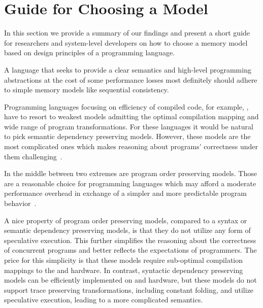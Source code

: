 \section{Guide for Choosing a Model}
\label{sec:discussion}

In this section we provide a summary of our findings
and present a short guide for researchers and system-level developers 
on how to choose a memory model based on 
design principles of a programming language.   

A language that seeks to provide a clear semantics and 
high-level programming abstractions at the cost 
of some performance losses most definitely should 
adhere to simple memory models like sequential consistency. 

Programming languages focusing on efficiency 
of compiled code, for example, \CPP, 
have to resort to weakest models admitting 
the optimal compilation mapping 
and wide range of program transformations. 
For these languages it would be natural 
to pick semantic dependency preserving models.
However, these models are the most complicated ones
which makes reasoning about programs' correctness
under them challenging~\cite{Svendsen-al:ESOP18}.

In the middle between two extremes are program order preserving models.
Those are a reasonable choice for programming languages
which may afford a moderate performance overhead 
in exchange of a simpler and more predictable program behavior~\cite{Ou-Demsky:OOPSLA18}.

A nice property of program order preserving models, compared 
to a syntax or semantic dependency preserving models, 
is that they do not utilize any form of speculative execution. 
This further simplifies the reasoning about the correctness
of concurrent programs and better reflects the 
expectations of programmers. 
The price for this simplicity is that 
these models require sub-optimal compilation mappings 
to the \ARM and \POWER hardware.
In contrast, syntactic dependency preserving models 
can be efficiently implemented on \ARM and \POWER hardware,
but these models do not support trace preserving transformations,
including constant folding, and utilize speculative execution, 
leading to a more complicated semantics.   


